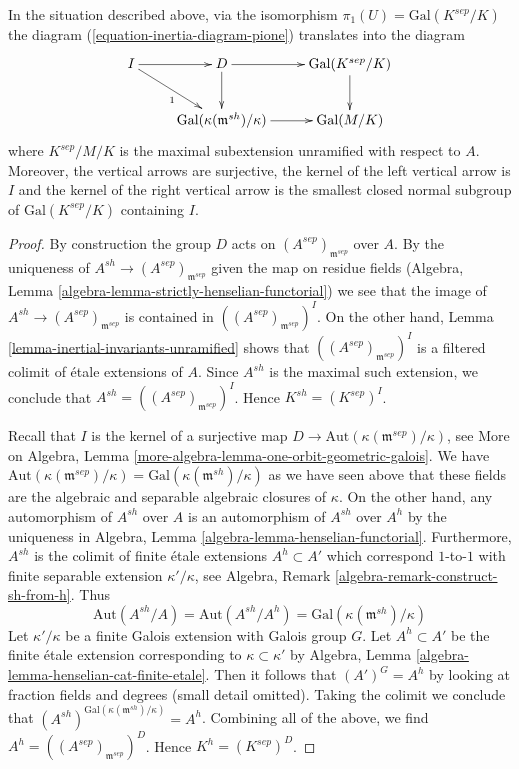 \begin{lemma}
\label{lemma-identify-inertia}
In the situation described above, via the isomorphism
$\pi_1(U) = \text{Gal}(K^{sep}/K)$ the diagram
(\ref{equation-inertia-diagram-pione})
translates into the diagram
$$
\xymatrix{
I \ar[r] \ar[rd]_1 & D \ar[d] \ar[r] & \text{Gal}(K^{sep}/K) \ar[d] \\
& \text{Gal}(\kappa(\mathfrak m^{sh})/\kappa) \ar[r] & \text{Gal}(M/K)
}
$$
where $K^{sep}/M/K$ is the maximal subextension unramified
with respect to $A$. Moreover, the vertical arrows are surjective,
the kernel of the left vertical arrow is $I$ and the kernel of the
right vertical arrow is
the smallest closed normal subgroup of $\text{Gal}(K^{sep}/K)$
containing $I$.
\end{lemma}

\begin{proof}
By construction the group $D$ acts on $(A^{sep})_{\mathfrak m^{sep}}$
over $A$. By the uniqueness of $A^{sh} \to (A^{sep})_{\mathfrak m^{sep}}$
given the map on residue fields
(Algebra, Lemma \ref{algebra-lemma-strictly-henselian-functorial})
we see that the image of $A^{sh} \to (A^{sep})_{\mathfrak m^{sep}}$
is contained in $((A^{sep})_{\mathfrak m^{sep}})^I$.
On the other hand,
Lemma \ref{lemma-inertial-invariants-unramified}
shows that $((A^{sep})_{\mathfrak m^{sep}})^I$
is a filtered colimit of \'etale extensions of $A$.
Since $A^{sh}$ is the maximal such extension, we conclude
that $A^{sh} = ((A^{sep})_{\mathfrak m^{sep}})^I$.
Hence $K^{sh} = (K^{sep})^I$.

\medskip\noindent
Recall that $I$ is the kernel of a surjective map
$D \to \text{Aut}(\kappa(\mathfrak m^{sep})/\kappa)$, see
More on Algebra, Lemma \ref{more-algebra-lemma-one-orbit-geometric-galois}.
We have $\text{Aut}(\kappa(\mathfrak m^{sep})/\kappa) =
\text{Gal}(\kappa(\mathfrak m^{sh})/\kappa)$
as we have seen above that these fields are the algebraic
and separable algebraic closures of $\kappa$.
On the other hand, any automorphism of $A^{sh}$ over $A$
is an automorphism of $A^{sh}$ over $A^h$ by the uniqueness
in Algebra, Lemma \ref{algebra-lemma-henselian-functorial}.
Furthermore, $A^{sh}$ is the colimit of finite \'etale
extensions $A^h \subset A'$ which correspond $1$-to-$1$
with finite separable extension $\kappa'/\kappa$, see
Algebra, Remark \ref{algebra-remark-construct-sh-from-h}.
Thus
$$
\text{Aut}(A^{sh}/A) = \text{Aut}(A^{sh}/A^h) =
\text{Gal}(\kappa(\mathfrak m^{sh})/\kappa)
$$
Let $\kappa'/\kappa$ be a finite Galois extension with
Galois group $G$. Let $A^h \subset A'$ be the finite \'etale extension
corresponding to $\kappa \subset \kappa'$ by
Algebra, Lemma \ref{algebra-lemma-henselian-cat-finite-etale}.
Then it follows that
$(A')^G = A^h$ by looking at fraction fields and degrees
(small detail omitted). Taking the colimit we conclude that
$(A^{sh})^{\text{Gal}(\kappa(\mathfrak m^{sh})/\kappa)} = A^h$.
Combining all of the above, we find $A^h = ((A^{sep})_{\mathfrak m^{sep}})^D$.
Hence $K^h = (K^{sep})^D$.


\end{proof}
